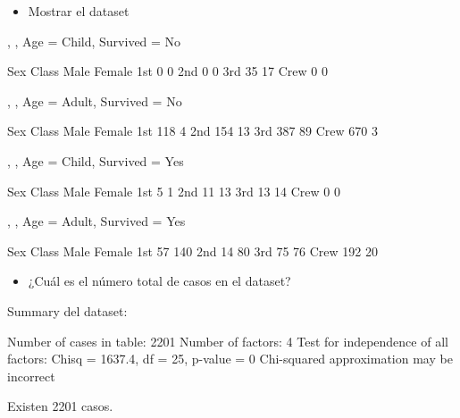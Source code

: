 \documentclass[a4paper]{article}
\begin{document}
\begin{itemize}
\item Mostrar el dataset
\end{itemize}
\begin{Schunk}
\begin{Soutput}
, , Age = Child, Survived = No

      Sex
Class  Male Female
  1st     0      0
  2nd     0      0
  3rd    35     17
  Crew    0      0

, , Age = Adult, Survived = No

      Sex
Class  Male Female
  1st   118      4
  2nd   154     13
  3rd   387     89
  Crew  670      3

, , Age = Child, Survived = Yes

      Sex
Class  Male Female
  1st     5      1
  2nd    11     13
  3rd    13     14
  Crew    0      0

, , Age = Adult, Survived = Yes

      Sex
Class  Male Female
  1st    57    140
  2nd    14     80
  3rd    75     76
  Crew  192     20
\end{Soutput}
\end{Schunk}

\begin{itemize}
\item ¿Cuál es el número total de casos en el dataset?
\end{itemize}
Summary del dataset:
\begin{Schunk}
\begin{Soutput}
Number of cases in table: 2201 
Number of factors: 4 
Test for independence of all factors:
	Chisq = 1637.4, df = 25, p-value = 0
	Chi-squared approximation may be incorrect
\end{Soutput}
\end{Schunk}
Existen 2201 casos.
\end{document}
